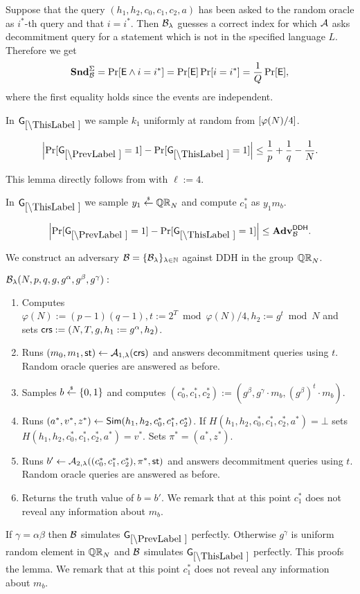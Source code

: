 Suppose that the query $(h_1, h_2,c_0,c_1,c_2,a)$ has been asked to the random oracle as $i^*$-th query and that $i=i^*$. Then $\mathcal{B}_{\lambda}$ guesses a correct index for which $\mathcal{A}$ asks decommitment query for a statement which is not in the specified language $L$. Therefore we get
\[\mathbf{Snd}^\Sigma_{\mathcal{B}} = \Pr[\mathsf{E} \land i=i^*] = \Pr[\mathsf{E}]\Pr[i=i^*] = \frac{1}{Q}\Pr[\mathsf{E}],\]
where the first equality holds since the events are independent.


In $\games_\thisgame$ we sample $k_1$ uniformly at random from $[\varphi(N)/4]$.

\begin{lemma}
\[
\left|\Pr[\games_\prevgame = 1] - \Pr[\games_\thisgame = 1]\right| \leq \frac{1}{p}+\frac{1}{q}-\frac{1}{N}.
\]
\end{lemma}

This lemma directly follows from  with $\ell:=4$.

In $\games_\thisgame$ we sample $y_1 \stackrel{{\scriptscriptstyle\$}}{\leftarrow} \mathbb{QR}_N$ and compute $c_1^*$ as  $y_1 m_b$. 

\begin{lemma}
\[
\left|\Pr[\games_\prevgame = 1] - \Pr[\games_\thisgame = 1]\right| \leq \advtg_\advB^\ddh.
\]
\end{lemma}
We construct an adversary $\mathcal{B} = \{\mathcal{B}_{\lambda}\}_{\lambda \in \mathbb{N}}$ against DDH in the group $\mathbb{QR}_N$. %

$\mathcal{B}_{\lambda}(N,p,q,g,g^\alpha, g^\beta, g^\gamma):$
\vspace{-2mm}
\begin{enumerate}
\item Computes $\varphi(N):=(p-1)(q-1), t:=2^{T} \bmod \varphi(N)/4, h_2:=g^t \bmod N$ and sets $\mathsf{crs}:=(N, T, g, h_1: = g^\alpha, h_2)$.
\item Runs $(m_0, m_1, \mathsf{st}) \leftarrow \mathcal{A}_{1, \lambda}(\mathsf{crs})$ and answers decommitment queries using $t$. Random oracle queries are answered as before.
\item Samples $b \stackrel{{\scriptscriptstyle\$}}{\leftarrow} \{0,1\}$ and computes $(c_0^*, c_1^*, c_2^*):=(g^\beta, g^\gamma \cdot m_b, (g^\beta)^t \cdot m_b).$ 
\item Runs $(a^*,v^*,z^*) \leftarrow \mathsf{Sim}(h_1, h_2, c_0^*, c_1^*, c_2^*)$. If $H(h_1, h_2, c_0^*, c_1^*, c_2^*,a^*) = \bot$ sets $H(h_1, h_2, c_0^*, c_1^*, c_2^*,a^*) = v^*$. Sets $\pi^* = (a^*,z^*)$.
\item Runs $b' \leftarrow \mathcal{A}_{2, \lambda}((c_0^*, c_1^*, c_2^*), \pi^*, \mathsf{st})$ and answers decommitment queries using $t$. Random oracle queries are answered as before.
\item Returns the truth value of $b=b'$. We remark that at this point $c_1^*$ does not reveal any information about $m_b$.
\end{enumerate}
If $\gamma = \alpha\beta$ then $\mathcal{B}$ simulates $\games_\prevgame$ perfectly. Otherwise $g^\gamma$ is uniform random element in $\mathbb{QR}_N$ and $\mathcal{B}$ simulates $\games_\thisgame$ perfectly. This proofs the lemma. We remark that at this point $c_1^*$ does not reveal any information about $m_b$.


